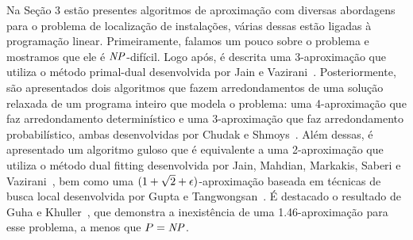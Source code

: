 \documentclass[12pt]{article}
\begin{document}
Na Seção 3 estão presentes algoritmos de aproximação com diversas abordagens para o problema de localização de instalações, várias dessas estão ligadas à programação linear. Primeiramente, falamos um pouco sobre o problema e mostramos que ele é $\mathit{NP}$-difícil. Logo após, é descrita uma 3-aproximação que utiliza o método primal-dual desenvolvida por Jain e Vazirani~\cite{JV}. Posteriormente, são apresentados dois algoritmos que fazem arredondamentos de uma solução relaxada de um programa inteiro que modela o problema: uma 4-aproximação que faz arredondamento determinístico e uma 3-aproximação que faz arredondamento probabilístico, ambas desenvolvidas por Chudak e Shmoys~\cite{Chudak2003}. Além dessas, é apresentado um algoritmo guloso que é equivalente a uma 2-aproximação que utiliza o método dual fitting desenvolvida por Jain, Mahdian, Markakis, Saberi e Vazirani~\cite{jain2002greedy}, bem como uma $(1 + \sqrt{2} + \epsilon)$-aproximação baseada em técnicas de busca local desenvolvida por Gupta e Tangwongsan~\cite{DBLP:journals/corr/abs-0809-2554}. É destacado o resultado de Guha e Khuller~\cite{GUHA1999228}, que demonstra a inexistência de uma 1.46-aproximação para esse problema, a menos que $P=\mathit{NP}$.
\end{document}
